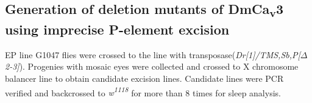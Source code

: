 \subsection*{Generation of deletion mutants of DmCa\textsubscript{v}3 using imprecise P-element excision}

EP line G1047 flies were crossed to the line with transposase(\emph{Dr[1]/TMS,Sb,P[$\Delta$2-3]}). Progenies with mosaic eyes were collected and crossed to X chromosome balancer line to obtain candidate excision lines. Candidate lines were PCR verified and backcrossed to \emph{w\textsuperscript{1118}} for more than 8 times for sleep analysis.

  
  
  